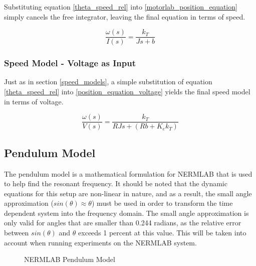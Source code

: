Substituting equation \ref{theta_speed_rel} into \ref{motorlab_position_equation} simply cancels the free integrator, leaving the final equation in terms of speed.

\begin{equation}
\label{motorlab_speed_equation}
\frac{\omega(s)}{I(s)} = \frac{k_T}{Js + b}
\end{equation}

\subsubsection{Speed Model - Voltage as Input}

Just as in section \ref{speed_models}, a simple substitution of equation \ref{theta_speed_rel} into \ref{position_equation_voltage} yields the final speed model in terms of voltage.

\begin{equation}
\label{speed_equation_voltage}
\frac{\omega(s)}{V(s)} = \frac{k_T}{RJs + (Rb + K_ek_T)}
\end{equation}


\subsection{Pendulum Model}

The pendulum model is a mathematical formulation for NERMLAB that is used to help find the resonant frequency. It should be noted that the dynamic equations for this setup are non-linear in nature, and as a result, the small angle approximation ($sin(\theta) \approx \theta$) must be used in order to transform the time dependent system into the frequency domain. The small angle approximation is only valid for angles that are smaller than 0.244 radians, as the relative error between $sin(\theta)$ and $\theta$ exceeds 1 percent at this value. This will be taken into account when running experiments on the NERMLAB system.

\begin{figure}[H]
	\begin{center}
		\caption[NERMLAB Pendulum Model]{NERMLAB Pendulum Model}
		\label{model_pendulum_chp4}
		
	\end{center}
\end{figure}

